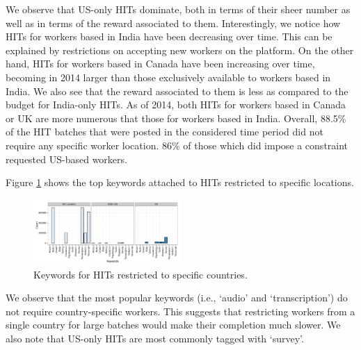 We observe that US-only HITs dominate, both in terms of their sheer number as well as in terms of the reward associated to them. 
Interestingly, we notice how HITs for workers based in India have been decreasing over time. This can be explained by \amt{} restrictions on accepting new workers on the platform.
On the other hand, HITs for workers based in Canada have been increasing over time, becoming in 2014 larger than those exclusively available to workers based in India.  We also see that the reward associated to them is less as compared to the budget for India-only HITs.
As of 2014, both HITs for workers based in Canada or UK are more numerous that those for workers based in India.
Overall, 88.5\% of the HIT batches that were posted in the considered time period did not require any specific worker location. 86\% of those which did impose a constraint requested US-based workers.


Figure \ref{fig:keyword_loc} shows the top keywords attached to HITs restricted to specific locations.
\begin{figure}[tb]
	\centering
		\includegraphics[width=0.5\textwidth]{figures/keywords_location}
	\caption{Keywords for HITs restricted to specific countries.}
	\label{fig:keyword_loc}
\end{figure}
We observe that the most popular keywords (i.e., `audio' and `transcription') do not require country-specific workers. This suggests that restricting workers from a single country for large batches would make their completion much slower. We also note that US-only HITs are most commonly tagged with `survey'.


